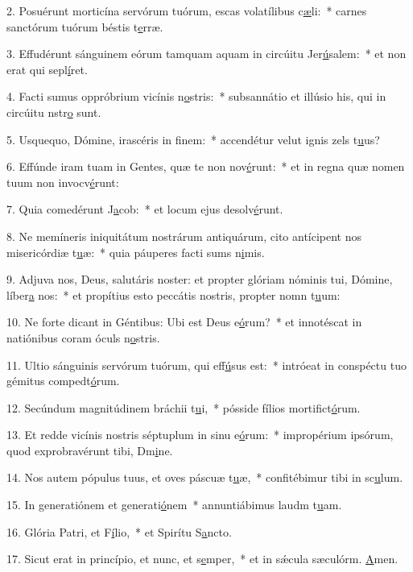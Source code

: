 2. Posuérunt morticína servórum tuórum, escas volatílibus c\uline{æ}li:~* carnes sanctórum tuórum béstis t\uline{e}rræ.\par 
3. Effudérunt sánguinem eórum tamquam aquam in circúitu Jer\uline{ú}salem:~* et non erat qui sepl\uline{í}ret.\par 
4. Facti sumus oppróbrium vicínis n\uline{o}stris:~* subsannátio et illúsio his, qui in circúitu nstr\uline{o} sunt.\par 
5. Usquequo, Dómine, irascéris in f\uline{i}nem:~* accendétur velut ignis zels t\uline{u}us?\par 
6. Effúnde iram tuam in Gentes, quæ te non nov\uline{é}runt:~* et in regna quæ nomen tuum non invocv\uline{é}runt:\par 
7. Quia comedérunt J\uline{a}cob:~* et locum ejus desolv\uline{é}runt.\par 
8. Ne memíneris iniquitátum nostrárum antiquárum, cito antícipent nos misericórdiæ t\uline{u}æ:~* quia páuperes facti sums n\uline{i}mis.\par 
9. Adjuva nos, Deus, salutáris noster: et propter glóriam nóminis tui, Dómine, líber\uline{a} nos:~* et propítius esto peccátis nostris, propter nomn t\uline{u}um:\par 
10. Ne forte dicant in Géntibus: Ubi est Deus e\uline{ó}rum?~* et innotéscat in natiónibus coram óculs n\uline{o}stris.\par 
11. Ultio sánguinis servórum tuórum, qui eff\uline{ú}sus est:~* intróeat in conspéctu tuo gémitus compedt\uline{ó}rum.\par 
12. Secúndum magnitúdinem bráchii t\uline{u}i,~* pósside fílios mortifict\uline{ó}rum.\par 
13. Et redde vicínis nostris séptuplum in sinu e\uline{ó}rum:~* impropérium ipsórum, quod exprobravérunt tibi, Dm\uline{i}ne.\par 
14. Nos autem pópulus tuus, et oves páscuæ t\uline{u}æ,~* confitébimur tibi in sc\uline{u}lum.\par 
15. In generatiónem et generati\uline{ó}nem~* annuntiábimus laudm t\uline{u}am.\par 
16. Glória Patri, et F\uline{í}lio,~* et Spirítu S\uline{a}ncto.\par 
17. Sicut erat in princípio, et nunc, et s\uline{e}mper,~* et in sǽcula sæculórm. \uline{A}men.\par 
